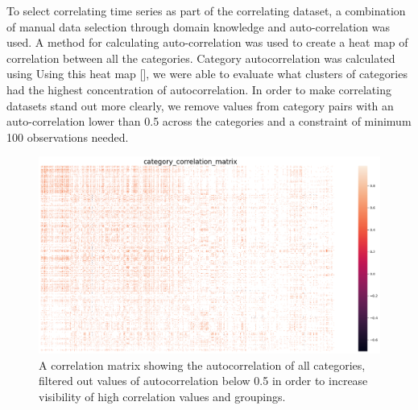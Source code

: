 To select correlating time series as part of the correlating dataset, a combination of manual data selection through domain knowledge and auto-correlation was used.
A method for calculating auto-correlation was used to create a heat map of correlation between all the categories.
Category autocorrelation was calculated using
Using this heat map [], we were able to evaluate what clusters of categories had the highest concentration of autocorrelation.
In order to make correlating datasets stand out more clearly, we remove values from category pairs with an auto-correlation lower than 0.5 across the categories
and a constraint of minimum 100 observations needed.
\begin{figure}[h!]
  \centering
  \includegraphics[width=\textwidth]{./figs/dataset/category_correlation_matrix.png}
  \hfill
  \caption{A correlation matrix showing the autocorrelation of all categories, filtered out values of autocorrelation below 0.5 in order to increase visibility of high correlation values and groupings.}
  \label{fig:dataset:heatmap_correlating}
\end{figure}

